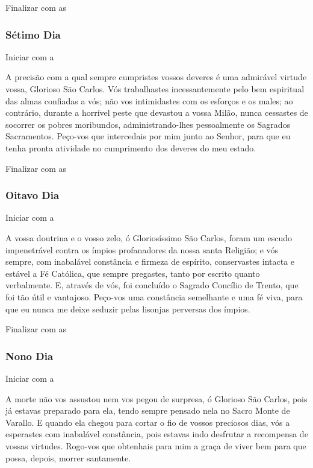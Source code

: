 \documentclass[a4paper,14pt]{extarticle} \usepackage[utf8]{inputenc}
\begin{document}
Finalizar com as \textbf{}

\subsubsection{Sétimo Dia}
Iniciar com a \textbf{}

A precisão com a qual sempre cumpristes vossos deveres é uma admirável virtude vossa, Glorioso São Carlos. Vós trabalhastes incessantemente pelo bem espiritual das almas confiadas a vós; não vos intimidastes com os esforços e os males; ao contrário, durante a horrível peste que devastou a vossa Milão, nunca cessastes de socorrer os pobres moribundos, administrando-lhes pessoalmente os Sagrados Sacramentos. Peço-vos que intercedais por mim junto ao Senhor, para que eu tenha pronta atividade no cumprimento dos deveres do meu estado.

Finalizar com as \textbf{}

\subsubsection{Oitavo Dia}
Iniciar com a \textbf{}

A vossa doutrina e o vosso zelo, ó Gloriosíssimo São Carlos, foram um escudo impenetrável contra os ímpios profanadores da nossa santa Religião; e vós sempre, com inabalável constância e firmeza de espírito, conservastes intacta e estável a Fé Católica, que sempre pregastes, tanto por escrito quanto verbalmente. E, através de vós, foi concluído o Sagrado Concílio de Trento, que foi tão útil e vantajoso. Peço-vos uma constância semelhante e uma fé viva, para que eu nunca me deixe seduzir pelas lisonjas perversas dos ímpios.

Finalizar com as \textbf{}

\subsubsection{Nono Dia}
Iniciar com a \textbf{}

A morte não vos assustou nem vos pegou de surpresa, ó Glorioso São Carlos, pois já estavas preparado para ela, tendo sempre pensado nela no Sacro Monte de Varallo. E quando ela chegou para cortar o fio de vossos preciosos dias, vós a esperastes com inabalável constância, pois estavas indo desfrutar a recompensa de vossas virtudes. Rogo-vos que obtenhais para mim a graça de viver bem para que possa, depois, morrer santamente.
\end{document}
